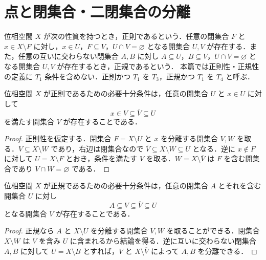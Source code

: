 \section{点と閉集合・二閉集合の分離}
\begin{defn}[正則空間と正規空間]
位相空間 $X$ が次の性質を持つとき，正則であるという．任意の閉集合 $F$ と $x\in X\setminus F$ に対し，$x\in U$，$F\subseteq V$，$U\cap V=\varnothing$ となる開集合 $U,V$ が存在する．また，任意の互いに交わらない閉集合 $A,B$ に対し $A\subseteq U$，$B\subseteq V$，$U\cap V=\varnothing$ となる開集合 $U,V$ が存在するとき，正規であるという．
本篇では正則性・正規性の定義に $T_1$ 条件を含めない．正則かつ $T_1$ を $T_3$，正規かつ $T_1$ を $T_4$ と呼ぶ．
\end{defn}
\begin{prop}[正則性の閉包による判定]
位相空間 $X$ が正則であるための必要十分条件は，任意の開集合 $U$ と $x\in U$ に対して
\[
 x\in V\subseteq\overline V\subseteq U
\]
を満たす開集合 $V$ が存在することである．
\end{prop}
\begin{proof}
正則性を仮定する．閉集合 $F=X\setminus U$ と $x$ を分離する開集合 $V,W$ を取る．$V\subseteq X\setminus W$ であり，右辺は閉集合なので $\overline V\subseteq X\setminus W\subseteq U$ となる．逆に $x\notin F$ に対して $U=X\setminus F$ とおき，条件を満たす $V$ を取る．$W=X\setminus\overline V$ は $F$ を含む開集合であり $V\cap W=\varnothing$ である．
\end{proof}
\begin{prop}[正規性の閉包による判定]
位相空間 $X$ が正規であるための必要十分条件は，任意の閉集合 $A$ とそれを含む開集合 $U$ に対し
\[
 A\subseteq V\subseteq\overline V\subseteq U
\]
となる開集合 $V$ が存在することである．
\end{prop}
\begin{proof}
正規なら $A$ と $X\setminus U$ を分離する開集合 $V,W$ を取ることができる．閉集合 $X\setminus W$ は $V$ を含み $U$ に含まれるから結論を得る．逆に互いに交わらない閉集合 $A,B$ に対して $U=X\setminus B$ とすれば，$V$ と $X\setminus\overline V$ によって $A,B$ を分離できる．
\end{proof}
